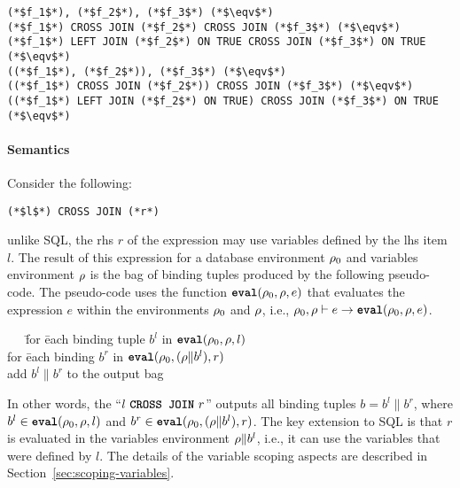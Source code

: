 \begin{lstlisting}
(*$f_1$*), (*$f_2$*), (*$f_3$*) (*$\eqv$*)
(*$f_1$*) CROSS JOIN (*$f_2$*) CROSS JOIN (*$f_3$*) (*$\eqv$*)
(*$f_1$*) LEFT JOIN (*$f_2$*) ON TRUE CROSS JOIN (*$f_3$*) ON TRUE (*$\eqv$*)
((*$f_1$*), (*$f_2$*)), (*$f_3$*) (*$\eqv$*)
((*$f_1$*) CROSS JOIN (*$f_2$*)) CROSS JOIN (*$f_3$*) (*$\eqv$*)
((*$f_1$*) LEFT JOIN (*$f_2$*) ON TRUE) CROSS JOIN (*$f_3$*) ON TRUE (*$\eqv$*)
\end{lstlisting}

\paragraph{Semantics} Consider the following:

\begin{lstlisting}
(*$l$*) CROSS JOIN (*r*)
\end{lstlisting}

\noindent unlike SQL, the rhs $r$ of the expression may use variables defined by
the lhs item $l$.  The result of this expression for a database environment
$\rho_{0}$ and variables environment $\rho$ is the bag of binding tuples produced by
the following pseudo-code. The pseudo-code uses the function $\texttt{\textbf{eval}}(\rho_{0}, \rho,
e)$ that evaluates the expression $e$ within the environments $\rho_{0}$ and $\rho$,
i.e., $\rho_{0}, \rho \vdash e \rightarrow \texttt{\textbf{eval}}(\rho_{0}, \rho, e)$.

\begin{tabbing}
\ \ \ \=for \=each binding tuple $b^l$ in $\texttt{\textbf{eval}}(\rho_{0}, \rho, l)$\\
\>\>for \=each binding $b^r$ in $\texttt{\textbf{eval}}(\rho_{0}, (\rho \| b^l), r)$\\
\>\>\>add $b^l \| b^r$ to the output bag
\end{tabbing}

In other words, the ``$l\ \CROSSJOIN\ r$'' outputs all binding tuples $b = b^l
\| b^r$, where $b^l \in \texttt{\textbf{eval}}(\rho_{0}, \rho, l)$ and $b^r \in \texttt{\textbf{eval}}(\rho_{0}, (\rho \|
b^l), r)$. The key extension to SQL is that $r$ is evaluated in the variables
environment $\rho \| b^l$, i.e., it can use the variables that were defined by
$l$. The details of the variable scoping aspects are described in
Section~\ref{sec:scoping-variables}.

